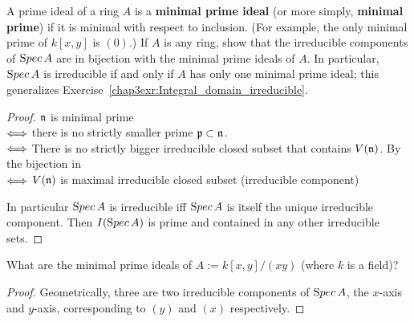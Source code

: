 \documentclass[11pt,fleqn]{book}
\begin{document}
\begin{exr}
A prime ideal of a ring $A$ is a \textbf{minimal prime ideal} (or more simply, \textbf{minimal prime}) if it is minimal with respect to inclusion. (For example, the only minimal prime of $k[x, y] $ is $(0).$) If $A$ is any ring, show that the irreducible components of ${\text Spec\,} A$ are in bijection with the minimal prime ideals of $A$. In particular, ${\text Spec\,} A$ is irreducible if and only if $A$ has only one minimal prime ideal; this generalizes Exercise~\ref{chap3exr:Integral_domain_irreducible}.
\end{exr}
\begin{proof}
${\mathfrak n}$ is minimal prime\\
$\Longleftrightarrow$ there is no strictly smaller prime ${\mathfrak p}\subset{\mathfrak n}$.\\
$\Longleftrightarrow$ There is no strictly bigger irreducible closed subset that contains $V({\mathfrak n})$. By the bijection in \\
$\Longleftrightarrow$ $V({\mathfrak n})$ is maximal irreducible closed subset (irreducible component)

In particular ${\text Spec\,} A$ is irreducible iff ${\text Spec\,} A$ is itself the unique irreducible component. Then $I({\text Spec\,} A)$ is prime and contained in any other irreducible sets.
\end{proof}

\begin{exr}
What are the minimal prime ideals of $A:=k[x, y]/(xy)$ (where $k$ is a field)?
\end{exr}
\begin{proof}
Geometrically, three are two irreducible components of ${\text Spec\,} A$, the $x$-axis and $y$-axis, corresponding to $(y)$ and $(x)$ respectively.
\end{proof}
\end{document}
